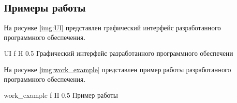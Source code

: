 \subsection{Примеры работы}

На рисунке \ref{img:UI} представлен графический интерфейс разработанного программного обеспечения.

{UI}
{f}
{H}
{0.5\textwidth}
{Графический интерфейс разработанного программного обеспечени}

На рисунке \ref{img:work_example} представлен пример работы разработанного программного обеспечения.

{work_example}
{f}
{H}
{0.5\textwidth}
{Пример работы}